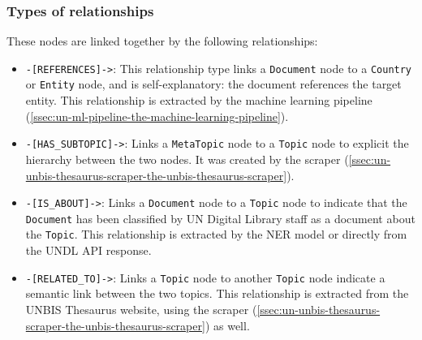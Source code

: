 \subsubsection{Types of relationships} \label{sssec:types-of-relationships}

These nodes are linked together by the following relationships:

\begin{itemize}
      \item \texttt{-[REFERENCES]->}:
            This relationship type links a \texttt{Document} node to a \texttt{Country} or \texttt{Entity} node, and is self-explanatory: the document references the target entity. This relationship is extracted by the machine learning pipeline (\ref{ssec:un-ml-pipeline-the-machine-learning-pipeline}).

      \item \texttt{-[HAS\_SUBTOPIC]->}:
            Links a \texttt{MetaTopic} node to a \texttt{Topic} node to explicit the hierarchy between the two nodes. It was created by the scraper (\ref{ssec:un-unbis-thesaurus-scraper-the-unbis-thesaurus-scraper}).

      \item \texttt{-[IS\_ABOUT]->}:
            Links a \texttt{Document} node to a \texttt{Topic} node to indicate that the \texttt{Document} has been classified by UN Digital Library staff as a document about the \texttt{Topic}. This relationship is extracted by the NER model or directly from the UNDL API response.

      \item \texttt{-[RELATED\_TO]->}:
            Links a \texttt{Topic} node to another \texttt{Topic} node indicate a semantic link between the two topics. This relationship is extracted from the UNBIS Thesaurus website, using the scraper (\ref{ssec:un-unbis-thesaurus-scraper-the-unbis-thesaurus-scraper}) as well.

\end{itemize}

